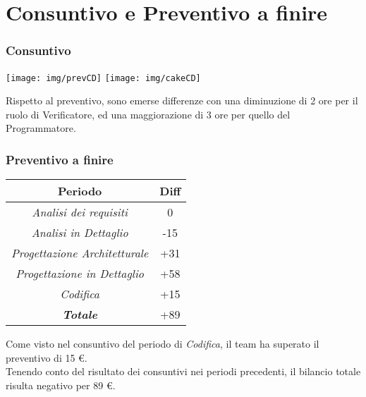 \section{Consuntivo e Preventivo a finire}
\begin{frame}
  \frametitle{Consuntivo}
  \begin{center}
  	\texttt{[image: img/prevCD]}
  	\texttt{[image: img/cakeCD]}
  \end{center}
Rispetto al preventivo, sono emerse differenze con una diminuzione di 2 ore per il ruolo di Verificatore, ed una maggiorazione di 3 ore per quello del Programmatore.
\end{frame}

\begin{frame}
	\frametitle{Preventivo a finire}
	
	\begin{center}
		\centering
		\begin{tabular}{|c|c|}
			\hline
			\textbf{Periodo} & \textbf{Diff} \\
			\hline
			\emph{Analisi dei requisiti}  & 0 \\
			\hline  \emph{Analisi in Dettaglio}  & -15 \\
			\hline  \emph{Progettazione Architetturale}  & +31 \\
			\hline  \emph{Progettazione in Dettaglio}  & +58 \\
			\hline  \emph{Codifica}  & +15 \\
			\hline  \emph{\textbf{Totale}}  & +89 \\
			\hline
		\end{tabular}
	\end{center}
	
	
Come visto nel consuntivo del periodo di \textit{Codifica}, il team ha superato il preventivo di 15 \euro.\\
Tenendo conto del risultato dei consuntivi nei periodi precedenti, il bilancio totale risulta negativo per 89 \euro.\\

\end{frame}

